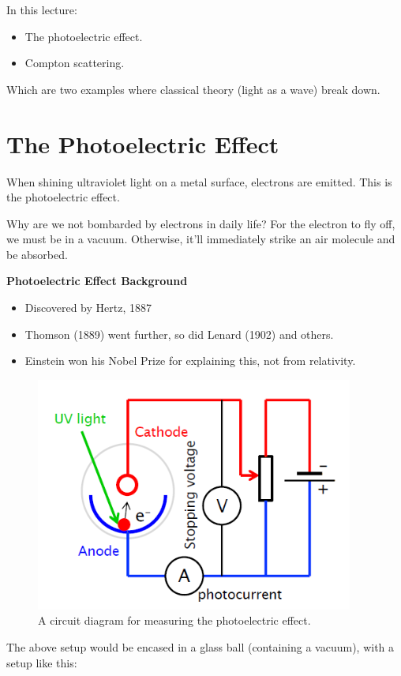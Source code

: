 
In this lecture:
\begin{itemize}
    \item The photoelectric effect.
    \item Compton scattering.
\end{itemize}
Which are two examples where classical theory (light as a wave) break down.

\section*{The Photoelectric Effect}
When shining ultraviolet light on a metal surface, electrons are emitted. This is the photoelectric effect. 

Why are we not bombarded by electrons in daily life? For the electron to fly off, we must be in a vacuum. Otherwise, it'll immediately strike an air molecule and be absorbed.

\textbf{Photoelectric Effect Background}
\begin{itemize}
    \item Discovered by Hertz, 1887
    \item Thomson (1889) went further, so did Lenard (1902) and others.
    \item Einstein won his Nobel Prize for explaining this, not from relativity.
\end{itemize}

\begin{figure}[H]
    \centering
    \includegraphics{figures/lec03-01.png}
     \caption{A circuit diagram for measuring the photoelectric effect.}
\end{figure}

The above setup would be encased in a glass ball (containing a vacuum), with a setup like this:

